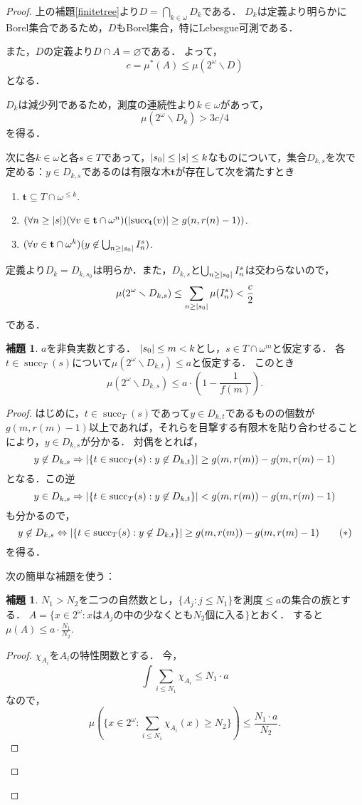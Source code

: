 \documentclass[uplatex]{jsarticle}
\newcommand{\suc}{\operatorname{succ}}
\DeclarePairedDelimiter\abs{\lvert}{\rvert}
\renewcommand\emptyset{\varnothing}
\renewcommand\subset{\subseteq}
\renewcommand{\setminus}{\smallsetminus}
\theoremstyle{definition}
\newtheorem{lem}[thm]{補題}
\begin{document}
\begin{proof}
		上の補題\ref{finitetree}より$D = \bigcap_{k \in \omega} D_k$である．
		$D_k$は定義より明らかにBorel集合であるため，$D$もBorel集合，特にLebesgue可測である．
		
		また，$D$の定義より$D \cap A = \emptyset$である．
		よって，
		\[c = \mu^*(A) \leq \mu(2^\omega \setminus D)\]
		となる．
		
		$D_k$は減少列であるため，測度の連続性より$k \in \omega$があって，
		\[
		\mu(2^\omega \setminus D_k) > 3c / 4
		\]
		を得る．
		
		次に各$k \in \omega$と各$s \in T$であって，$\abs{s_0} \le \abs{s} \le k$なものについて，集合$D_{k,s}$を次で定める：$y \in D_{k,s}$であるのは有限な木$\mathbf{t}$が存在して次を満たすとき
		\begin{enumerate}
			\item $\mathbf{t} \subset T \cap \omega^{\le k}$.
			\item $(\forall n \ge \abs{s})(\forall v \in \mathbf{t} \cap \omega^n)(\abs{\suc_{\mathbf{t}}(v)} \ge g(n, r(n)-1))$.
			\item $(\forall v \in \mathbf{t} \cap \omega^k)(y \not \in \bigcup_{n \ge \abs{s_0}} I^s_n)$.
		\end{enumerate}
	定義より$D_k = D_{k, s_0}$は明らか．また，$D_{k, s}$と$\bigcup_{n \ge \abs{s_0}} I^s_n$は交わらないので，
	\[
	\mu(2^\omega \setminus D_{k, s}) \le \sum_{n \ge \abs{s_0}} \mu(I^s_n) < \frac{c}2
	\]
	である．
	
	\begin{lem}
		$a$を非負実数とする．
		$\abs{s_0} \le m < k$とし，$s \in T \cap \omega^m$と仮定する．
		各$t \in \suc_T(s)$について$\mu(2^\omega \setminus D_{k, t}) \le a$と仮定する．
		このとき
		\[
		\mu(2^\omega \setminus D_{k,s}) \le a \cdot \left(1-\frac1{f(m)} \right).
		\]
	\end{lem}
	\begin{proof}
		はじめに，$t \in \suc_T(s)$であって$y \in D_{k,t}$であるものの個数が$g(m, r(m) - 1)$以上であれば，それらを目撃する有限木を貼り合わせることにより，$y \in D_{k, s}$が分かる．
		対偶をとれば，
		\[
		y \not \in D_{k,s} \Rightarrow \abs{\{t \in \suc_T(s) : y \not \in D_{k,t}\}} \ge g(m, r(m)) - g(m, r(m)-1)
		\]
		となる．この逆
		\[
		y \in D_{k,s} \Rightarrow \abs{\{t \in \suc_T(s) : y \not \in D_{k,t}\}} < g(m, r(m)) - g(m, r(m)-1)
		\]
		も分かるので，
		\[
		y \not \in D_{k,s} \Leftrightarrow \abs{\{t \in \suc_T(s) : y \not \in D_{k,t}\}} \ge g(m, r(m)) - g(m, r(m)-1) \tag{$\ast$}
		\]
		を得る．
		
		次の簡単な補題を使う：
		\begin{lem}
			$N_1 > N_2$を二つの自然数とし，$\{A_j : j \le N_1\}$を測度$\le a$の集合の族とする．
			$A = \{ x \in 2^\omega : \text{$x$は$A_j$の中の少なくとも$N_2$個に入る} \}$とおく．
			すると$\mu(A) \le a \cdot \frac{N_1}{N_2}$.
		\end{lem}
		\begin{proof}
			$\chi_{A_i}$を$A_i$の特性関数とする．
			今，
			\[
			\int \sum_{i \le N_1} \chi_{A_i} \le N_1 \cdot a
			\]
			なので，
			\[
			\mu(\{ x \in 2^\omega : \sum_{i \le N_1} \chi_{A_i}(x) \ge N_2 \}) \le \frac{N_1 \cdot a}{N_2}.	
			\]
		\end{proof}
	

\end{proof}
\end{proof}
\end{document}
